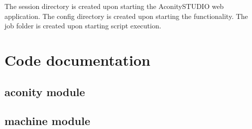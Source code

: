 \documentclass[letterpaper,10pt,english,openany,oneside]{sphinxmanual}
\begin{document}
\begin{sphinxVerbatim}[commandchars=\\\{\}]
    
     
                  
                 
                 
                 
\end{sphinxVerbatim}

The session directory is created upon starting the AconitySTUDIO web application.
The config directory is created upon starting the  functionality.
The job folder is created upon starting script execution.


\chapter{Code documentation}
\label{\detokenize{code:code-documentation}}\label{\detokenize{code::doc}}

\section{aconity module}
\label{\detokenize{_modules/aconity:aconity-module}}\label{\detokenize{_modules/aconity::doc}}

\section{machine module}
\label{\detokenize{_modules/machine:module-machine}}\label{\detokenize{_modules/machine:machine-module}}\label{\detokenize{_modules/machine::doc}}
\end{document}
